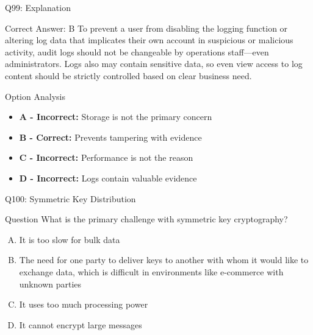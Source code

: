 \documentclass{beamer}
\begin{document}
	\begin{frame}{Q99: Explanation}
		\begin{block}{Correct Answer: B}
			To prevent a user from disabling the logging function or altering log data that implicates their own account in suspicious or malicious activity, audit logs should not be changeable by operations staff—even administrators. Logs also may contain sensitive data, so even view access to log content should be strictly controlled based on clear business need.
		\end{block}
		\begin{block}{Option Analysis}
			\begin{itemize}
				\item \textbf{A - Incorrect:} Storage is not the primary concern
				\item \textbf{B - Correct:} Prevents tampering with evidence
				\item \textbf{C - Incorrect:} Performance is not the reason
				\item \textbf{D - Incorrect:} Logs contain valuable evidence
			\end{itemize}
		\end{block}
	\end{frame}
	
	\begin{frame}{Q100: Symmetric Key Distribution}
		\begin{block}{Question}
			What is the primary challenge with symmetric key cryptography?
		\end{block}
		\begin{enumerate}[(A)]
			\item It is too slow for bulk data
			\item The need for one party to deliver keys to another with whom it would like to exchange data, which is difficult in environments like e-commerce with unknown parties
			\item It uses too much processing power
			\item It cannot encrypt large messages
		\end{enumerate}
	\end{frame}
	
\end{document}
